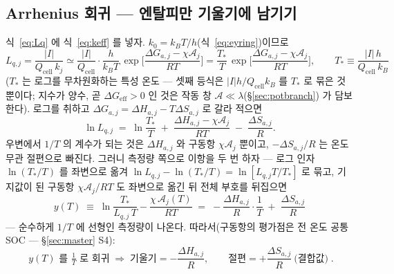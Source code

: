 \documentclass[11pt,a4paper]{article}
\newcommand{\eff}{\mathrm{eff}}
\newcommand{\cell}{\mathrm{cell}}
\begin{document}
\subsection{Arrhenius 회귀 — 엔탈피만 기울기에 남기기}
식~\eqref{eq:Lq} 에 식~\eqref{eq:keff} 를 넣자. $k_0=k_BT/h$(식~\eqref{eq:eyring})이므로
\begin{equation}
L_{q,j}=\frac{|I|}{Q_\cell\,k_j}
\simeq\frac{|I|}{Q_\cell}\cdot\frac{h}{k_BT}\,
\exp\!\Big[\frac{\Delta G_{a,j}-\chi\mathcal A_j}{RT}\Big]
=\frac{T_*}{T}\,\exp\!\Big[\frac{\Delta G_{a,j}-\chi\mathcal A_j}{RT}\Big],
\qquad T_*\equiv\frac{|I|\,h}{Q_\cell\,k_B}
\label{eq:LqT}
\end{equation}
($T_*$ 는 로그를 무차원화하는 특성 온도 — 셋째 등식은 $|I|h/Q_\cell k_B$ 를 $T_*$ 로 묶은 것뿐이다;
지수가 양수, 곧 $\Delta G_{\eff}>0$ 인 것은 작동 창 $\mathcal A\ll\lambda$(\S\ref{sec:potbranch})
가 담보한다).
로그를 취하고 $\Delta G_{a,j}=\Delta H_{a,j}-T\Delta S_{a,j}$ 로 갈라 적으면
\begin{equation}
\ln L_{q,j}\;=\;\ln\frac{T_*}{T}\;+\;\frac{\Delta H_{a,j}-\chi\mathcal A_j}{RT}
\;-\;\frac{\Delta S_{a,j}}{R}.
\label{eq:lnLq}
\end{equation}
우변에서 $1/T$ 의 계수가 되는 것은 $\Delta H_{a,j}$ 와 구동항 $\chi\mathcal A_j$ 뿐이고,
$-\Delta S_{a,j}/R$ 는 온도 무관 절편으로 빠진다. 그러니 측정량 쪽으로 이항을 두 번 하자 — 로그 인자
$\ln(T_*/T)$ 를 좌변으로 옮겨 $\ln L_{q,j}-\ln(T_*/T)=\ln[L_{q,j}T/T_*]$ 로 묶고, 기지값이 된
구동항 $\chi\mathcal A_j/RT$ 도 좌변으로 옮긴 뒤 전체 부호를 뒤집으면
\begin{equation}
y(T)\;\equiv\;\ln\frac{T_*}{L_{q,j}\,T}-\frac{\chi\,\mathcal A_j(T)}{RT}
\;=\;-\frac{\Delta H_{a,j}}{R}\cdot\frac1T\;+\;\frac{\Delta S_{a,j}}{R}
\label{eq:ydef}
\end{equation}
— 순수하게 $1/T$ 에 선형인 측정량이 나온다. 따라서(구동항의 평가점은 전 온도 공통 SOC —
\S\ref{sec:master} S4):
\begin{equation}
\boxed{\;y(T)\text{ 를 }\tfrac1T\text{ 로 회귀}\;\Rightarrow\;
\text{기울기}=-\frac{\Delta H_{a,j}}{R},\qquad
\text{절편}=+\frac{\Delta S_{a,j}}{R}\ \text{(결합값)}\;.}
\label{eq:arrhenius}
\end{equation}
\end{document}
